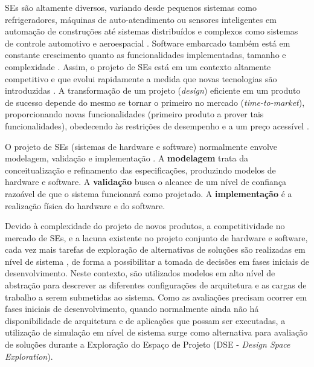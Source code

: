 \documentclass[tese-proposta,nocipinfo]{texufpel}
\begin{document}
SEs são altamente diversos, variando desde pequenos sistemas como refrigeradores, máquinas de auto-atendimento ou sensores inteligentes em automação de construções até sistemas distribuídos e complexos como sistemas de controle automotivo e aeroespacial \cite{Voelter2013}. Software embarcado também está em constante crescimento quanto as funcionalidades implementadas, tamanho e complexidade \cite{Hendriks2016}. Assim, o projeto de SEs está em um contexto altamente competitivo e que evolui rapidamente a medida que novas tecnologias são introduzidas \cite{bertels2012HW:SW:Introduction}. A transformação de um projeto (\textit{design}) eficiente em um produto de sucesso depende do mesmo se tornar o primeiro no mercado (\textit{time-to-market}), proporcionando novas funcionalidades (primeiro produto a prover tais funcionalidades), obedecendo às restrições de desempenho e a um preço acessível \cite{Herrera201455, mischkalla2010closing}.

O projeto de SEs (sistemas de hardware e software) normalmente envolve modelagem, validação e implementação \cite{DeMicheli_Gupta1997}. A \textbf{modelagem} trata da conceitualização e refinamento das especificações, produzindo modelos de hardware e software. A \textbf{validação} busca o alcance de um nível de confiança razoável de que o sistema funcionará como projetado. A \textbf{implementação} é a realização física do hardware e do software.

Devido à complexidade do projeto de novos produtos, a competitividade no mercado de SEs, e a lacuna existente no projeto conjunto de hardware e software, cada vez mais tarefas de exploração de alternativas de soluções são realizadas em nível de sistema \cite{gries2004methods,gajski2009embedded}, de forma a possibilitar a tomada de decisões em fases iniciais de desenvolvimento. Neste contexto, são utilizados modelos em alto nível de abstração para descrever as diferentes configurações de arquitetura e as cargas de trabalho a serem submetidas ao sistema. Como as avaliações precisam ocorrer em fases iniciais de desenvolvimento, quando normalmente ainda não há disponibilidade de arquitetura e de aplicações que possam ser executadas, a utilização de simulação em nível de sistema surge como alternativa para avaliação de soluções durante a Exploração do Espaço de Projeto (DSE - \textit{Design Space Exploration}). 
\end{document}
